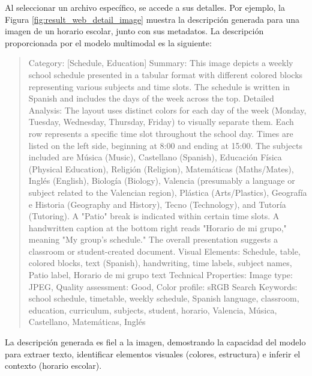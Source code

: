 Al seleccionar un archivo específico, se accede a sus detalles. Por ejemplo, la Figura \ref{fig:result_web_detail_image} muestra la descripción generada para una imagen de un horario escolar, junto con sus metadatos. La descripción proporcionada por el modelo multimodal es la siguiente:

\begin{quote}
Category: [Schedule, Education] Summary: This image depicts a weekly school schedule presented in a tabular format with different colored blocks representing various subjects and time slots. The schedule is written in Spanish and includes the days of the week across the top. Detailed Analysis: The layout uses distinct colors for each day of the week (Monday, Tuesday, Wednesday, Thursday, Friday) to visually separate them. Each row represents a specific time slot throughout the school day. Times are listed on the left side, beginning at 8:00 and ending at 15:00. The subjects included are Música (Music), Castellano (Spanish), Educación Física (Physical Education), Religión (Religion), Matemáticas (Maths/Mates), Inglés (English), Biología (Biology), Valencia (presumably a language or subject related to the Valencian region), Plástica (Arts/Plastics), Geografía e Historia (Geography and History), Tecno (Technology), and Tutoría (Tutoring). A "Patio" break is indicated within certain time slots. A handwritten caption at the bottom right reads "Horario de mi grupo," meaning "My group's schedule." The overall presentation suggests a classroom or student-created document. Visual Elements: Schedule, table, colored blocks, text (Spanish), handwriting, time labels, subject names, Patio label, Horario de mi grupo text Technical Properties: Image type: JPEG, Quality assessment: Good, Color profile: sRGB Search Keywords: school schedule, timetable, weekly schedule, Spanish language, classroom, education, curriculum, subjects, student, horario, Valencia, Música, Castellano, Matemáticas, Inglés
\end{quote}

La descripción generada es fiel a la imagen, demostrando la capacidad del modelo para extraer texto, identificar elementos visuales (colores, estructura) e inferir el contexto (horario escolar).

